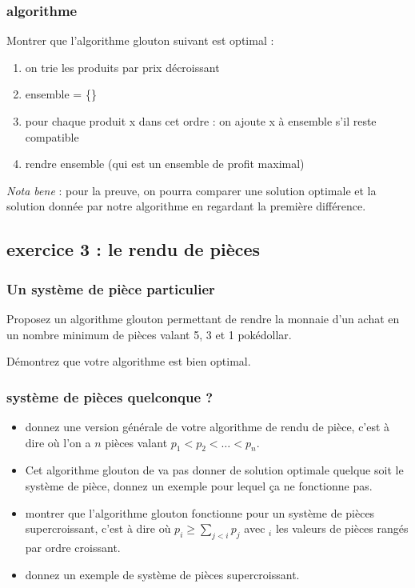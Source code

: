 \documentclass[
]{article}
\providecommand{\tightlist}{%
  \setlength{\itemsep}{0pt}\setlength{\parskip}{0pt}}
\begin{document}
\hypertarget{algorithme}{%
\subsubsection{algorithme}\label{algorithme}}

Montrer que l'algorithme glouton suivant est optimal :

\begin{enumerate}
\def\labelenumi{\arabic{enumi}.}
\tightlist
\item
  on trie les produits par prix décroissant
\item
  ensemble = \{\}
\item
  pour chaque produit x dans cet ordre : on ajoute x à ensemble s'il
  reste compatible
\item
  rendre ensemble (qui est un ensemble de profit maximal)
\end{enumerate}

\emph{Nota bene} : pour la preuve, on pourra comparer une solution
optimale et la solution donnée par notre algorithme en regardant la
première différence.

\hypertarget{exercice-3-le-rendu-de-piuxe8ces}{%
\subsection{exercice 3 : le rendu de
pièces}\label{exercice-3-le-rendu-de-piuxe8ces}}

\hypertarget{un-systuxe8me-de-piuxe8ce-particulier}{%
\subsubsection{Un système de pièce
particulier}\label{un-systuxe8me-de-piuxe8ce-particulier}}

Proposez un algorithme glouton permettant de rendre la monnaie d'un
achat en un nombre minimum de pièces valant 5, 3 et 1 pokédollar.

Démontrez que votre algorithme est bien optimal.

\hypertarget{systuxe8me-de-piuxe8ces-quelconque}{%
\subsubsection{système de pièces quelconque
?}\label{systuxe8me-de-piuxe8ces-quelconque}}

\begin{itemize}
\tightlist
\item
  donnez une version générale de votre algorithme de rendu de pièce,
  c'est à dire où l'on a \(n\) pièces valant
  \(p_1 < p_2 < \dots < p_n\).
\item
  Cet algorithme glouton de va pas donner de solution optimale quelque
  soit le système de pièce, donnez un exemple pour lequel ça ne
  fonctionne pas.
\item
  montrer que l'algorithme glouton fonctionne pour un système de pièces
  supercroissant, c'est à dire où \(p_i \geq \sum_{j< i} p_j\) avec
  \(_i\) les valeurs de pièces rangés par ordre croissant.
\item
  donnez un exemple de système de pièces supercroissant.
\end{itemize}
\end{document}
